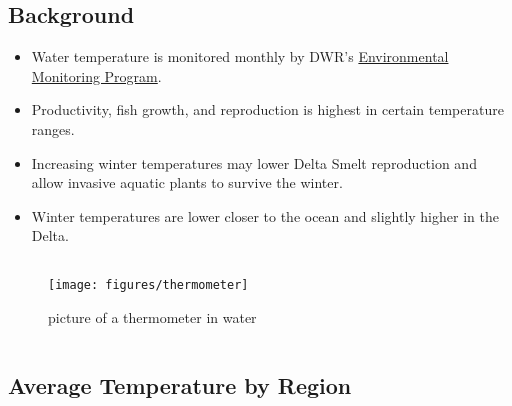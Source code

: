 \documentclass[
]{book}
\providecommand{\tightlist}{%
  \setlength{\itemsep}{0pt}\setlength{\parskip}{0pt}}
\begin{document}
\begin{columns-nocenter}

\begin{column}

\hypertarget{background-1}{%
\subsection{Background}\label{background-1}}

\begin{itemize}
\tightlist
\item
  Water temperature is monitored monthly by DWR's \href{https://emp.baydeltalive.com/wiki/12297}{Environmental Monitoring Program}.
\item
  Productivity, fish growth, and reproduction is highest in certain temperature ranges.
\item
  Increasing winter temperatures may lower Delta Smelt reproduction and allow invasive aquatic plants to survive the winter.
\item
  Winter temperatures are lower closer to the ocean and slightly higher in the Delta.
\end{itemize}

\end{column}

\begin{column}

\begin{figure}

{\centering \texttt{[image: figures/thermometer]} 

}

\caption{picture of a thermometer in water}\label{fig:unnamed-chunk-150}
\end{figure}

\end{column}

\end{columns-nocenter}

\hypertarget{average-temperature-by-region}{%
\subsection{Average Temperature by Region}\label{average-temperature-by-region}}
\end{document}
